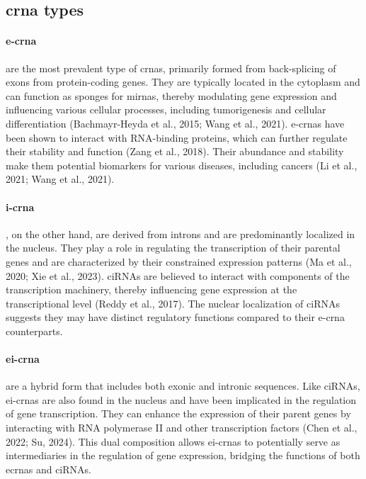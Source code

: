 \subsection{\gls{crna} types}
\label{sec:circrna_types}

\paragraph{\gls{e-crna}} are the most prevalent type of
\gls{crna}s, primarily formed from back-splicing of exons from protein-coding
genes.
They are typically located in the cytoplasm and can function as sponges for
\gls{mirna}s, thereby modulating gene expression and influencing various
cellular processes, including tumorigenesis and cellular differentiation
(Bachmayr-Heyda et al., 2015; Wang et al., 2021).
\gls{e-crna}s have been shown to interact with RNA-binding proteins, which can
further regulate their stability and function (Zang et al., 2018).
Their abundance and stability make them potential biomarkers for various
diseases, including cancers (Li et al., 2021; Wang et al., 2021).

\paragraph{\gls{i-crna}}, on the other hand, are derived
from introns
and are predominantly localized in the nucleus.
They play a role in regulating the transcription of their parental genes and
are characterized by their constrained expression patterns (Ma et al., 2020;
Xie et al., 2023).
ciRNAs are
believed to interact with components of the transcription machinery, thereby
influencing gene expression at the transcriptional level (Reddy et al., 2017).
The nuclear localization of ciRNAs suggests they may have distinct regulatory
functions compared to their \gls{e-crna} counterparts.

\paragraph{\gls{ei-crna}} are a hybrid form that
includes both
exonic and intronic sequences.
Like ciRNAs, \gls{ei-crna}s are also found in the nucleus and have been
implicated in the regulation of gene transcription.
They can enhance the expression of their parent genes by interacting with RNA
polymerase II and other transcription factors (Chen et al., 2022; Su, 2024).
This dual composition allows \gls{ei-crna}s to potentially serve as
intermediaries in the regulation of gene expression, bridging the functions of
both e\gls{crna}s and ciRNAs.

